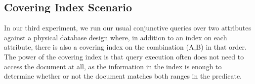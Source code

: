 


%
%

\vspace*{-0.5\baselineskip}
\subsection{Covering Index Scenario}
In our third experiment, we run our usual conjunctive queries over two attributes against a physical database design where, in addition to an index on each attribute, there is also a covering index on the combination (A,B) in that order. The power of the covering index is that query execution often does not need to access the document at all, as the information in the index is enough to determine whether or not the document matches both ranges in the predicate. 

